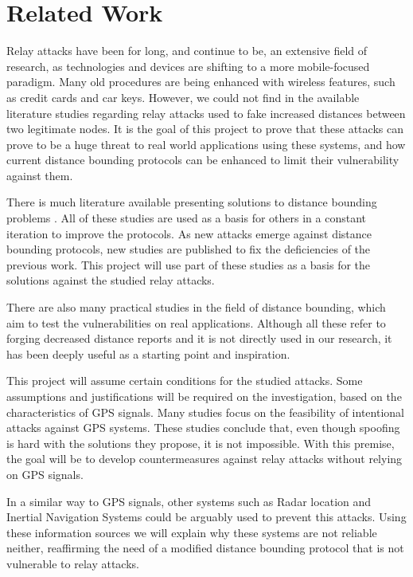 \documentclass{article}
\begin{document}
\section{Related Work}
\label{sec:relatedwork}

Relay attacks have been for long, and continue to be, an extensive field of research, as technologies and devices are shifting to a more mobile-focused paradigm. Many old procedures are being enhanced with wireless features, such as credit cards and car keys. However, we could not find in the available literature studies regarding relay attacks used to fake increased distances between two legitimate nodes. It is the goal of this project to prove that these attacks can prove to be a huge threat to real world applications using these systems, and how current distance bounding protocols can be enhanced to limit their vulnerability against them.

There is much literature available presenting solutions to distance bounding problems \cite{brands1994distance, tu2007rfid, rasmussen2010realization}. All of these studies are used as a basis for others in a constant iteration to improve the protocols. As new attacks emerge against distance bounding protocols, new studies are published to fix the deficiencies of the previous work. This project will use part of these studies as a basis for the solutions against the studied relay attacks.

There are also many practical studies in the field of distance bounding, which aim to test the vulnerabilities on real applications\cite{francillon2011relay, francis2010practical, hancke2005practical, markantonakis2012practical, vandenbreekel2014relay}. Although all these refer to forging decreased distance reports and it is not directly used in our research, it has been deeply useful as a starting point and inspiration.

This project will assume certain conditions for the studied attacks. Some assumptions and justifications will be required on the investigation, based on the characteristics of GPS signals. Many studies focus on the feasibility of intentional attacks against GPS systems\cite{warner2003gps, wen2005countermeasures, jafarnia2012gps}. These studies conclude that, even though spoofing is hard with the solutions they propose, it is not impossible. With this premise, the goal will be to develop countermeasures against relay attacks without relying on GPS signals.

In a similar way to GPS signals, other systems such as Radar location \cite{cadirci2009rf} and Inertial Navigation Systems \cite{patent:4085440} could be arguably used to prevent this attacks. Using these information sources we will explain why these systems are not reliable neither, reaffirming the need of a modified distance bounding protocol that is not vulnerable to relay attacks.
\end{document}
